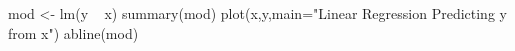 \begin{Schunk}
\begin{Sinput}
 mod <- lm(y ~ x)
 summary(mod)
 plot(x,y,main="Linear Regression Predicting y from x")
 abline(mod)
\end{Sinput}
\end{Schunk}
